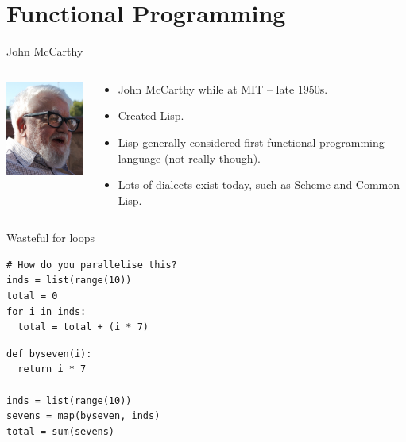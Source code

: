 \section{Functional Programming}
\begin{frame}{John McCarthy}
  \begin{columns}
    \begin{column}{1.5in}
      \includegraphics[width=1.4in]{img/john-mccarthy.png}
    \end{column}
    \begin{column}{0.7\textwidth}
      \begin{itemize}
        \item John McCarthy while at MIT -- late 1950s.
        \vspace{0.25cm}
        \item Created Lisp.
        \vspace{0.25cm}
        \item Lisp generally considered first functional programming language (not really though).
        \vspace{0.25cm}
        \item Lots of dialects exist today, such as Scheme and Common Lisp.
      \end{itemize}
    \end{column}
  \end{columns}
\end{frame}

\begin{frame}[fragile]{Wasteful for loops}
  \begin{verbatim}
# How do you parallelise this?
inds = list(range(10))
total = 0
for i in inds:
  total = total + (i * 7)
  \end{verbatim}
  \begin{verbatim}
def byseven(i):
  return i * 7

inds = list(range(10))
sevens = map(byseven, inds)
total = sum(sevens)
  \end{verbatim}
\end{frame}

